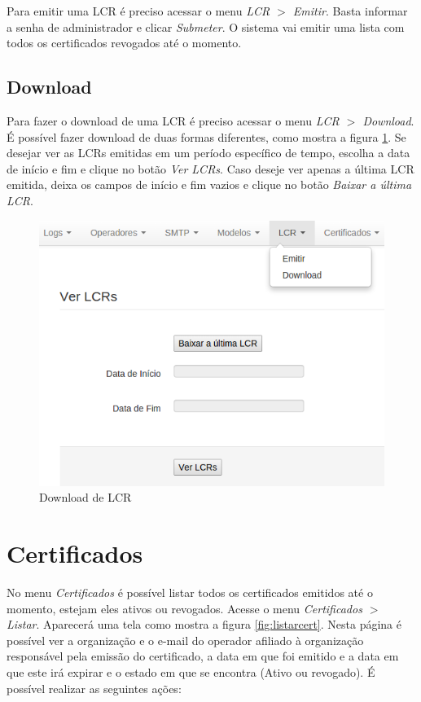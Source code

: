 Para emitir uma LCR é preciso acessar o menu \textit{LCR $>$ Emitir}. Basta informar a senha de administrador e clicar \emph{Submeter}. O sistema vai emitir uma lista com todos os certificados revogados até o momento.

\subsection{Download}

Para fazer o download de uma LCR é preciso acessar o menu \textit{LCR $>$ Download}. É possível fazer download de duas formas diferentes, como mostra a figura \ref{fig:lcr}. Se desejar ver as LCRs emitidas em um período específico de tempo, escolha a data de início e fim e clique no botão \emph{Ver LCRs}. Caso deseje ver apenas a última LCR emitida, deixa os campos de início e fim vazios e clique no botão \emph{Baixar a última LCR}.

\begin{figure}[ht]
     \centering
     \includegraphics[scale=0.6]{images/lcr.png}
     \caption{Download de LCR}
     \label{fig:lcr}
\end{figure}

\section{Certificados}

No menu \textit{Certificados} é possível listar todos os certificados emitidos até o momento, estejam eles ativos ou revogados. Acesse o menu \textit{Certificados $>$ Listar}. Aparecerá uma tela como mostra a figura \ref{fig:listarcert}. Nesta página é possível ver a organização e o e-mail do operador afiliado à organização responsável pela emissão do certificado, a data em que foi emitido e a data em que este irá expirar e o estado em que se encontra (Ativo ou revogado).
É possível realizar as seguintes ações:

